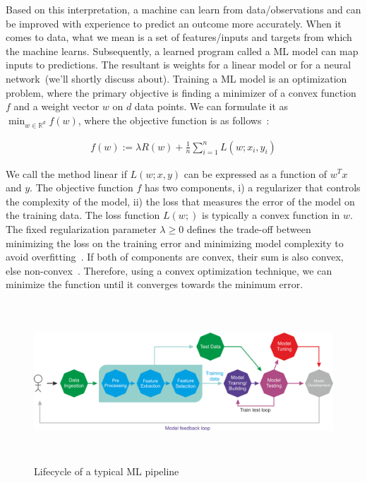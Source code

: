 \hspace*{3.5mm}Based on this interpretation, a machine can learn from data/observations and can be improved with experience to predict an outcome more accurately. When it comes to data, what we mean is a set of features/inputs and targets from which the machine learns. Subsequently, a learned program called a ML model can map inputs to predictions. The resultant is weights for a linear model or for a neural network~(we'll shortly discuss about). Training a ML model is an optimization problem, where the primary objective is finding a minimizer of a convex function $f$ and a weight vector $w$ on $d$ data points. We can formulate it as $\min _{w \in \mathbb{R}^{d}} f(w)$, where the objective function is as follows~\cite{karim2018scala}:

\vspace{-4mm}
\begin{align}
    f(w):=\lambda R(w)+\frac{1}{n} \sum_{i=1}^{n} L\left(w ; x_{i}, y_{i}\right)
\end{align}

\hspace*{3.5mm} We call the method linear if $L(w;x,y)$ can be expressed as a function of $w^Tx$ and $y$. The objective function $f$ has two components, i) a regularizer that controls the complexity of the model, ii) the loss that measures the error of the model on the training data. The loss function $L(w;)$ is typically a convex function in $w$. The fixed regularization parameter $\lambda \geq 0$ defines the trade-off between minimizing the loss on the training error and minimizing model complexity to avoid overfitting~\cite{karim2018scala}. If both of components are convex, their sum is also convex, else non-convex~\cite{zaccone2018deep}. Therefore, using a convex optimization technique, we can minimize the function until it converges towards the minimum error.  %

\begin{figure}[h]
	\centering
	\includegraphics[width=0.9\linewidth,height=60mm]{images/B08452_01_02.png}
	\caption{Lifecycle of a typical ML pipeline~\cite{karimScalaML2019}} 
	\label{fig:ml_pipeline}
\end{figure}

